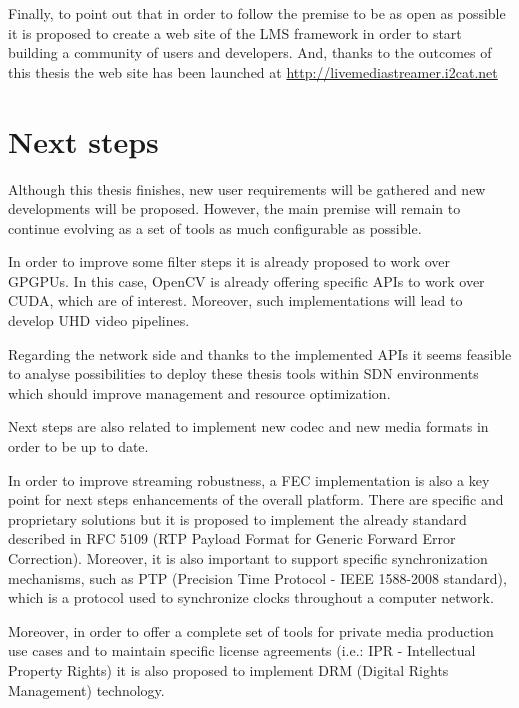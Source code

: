 Finally, to point out that in order to follow the premise to be as open as possible it is proposed to create a web site of the LMS framework in order to start building a community of users and developers. And, thanks to the outcomes of this thesis the web site has been launched at \href{http://livemediastreamer.i2cat.net}{http://livemediastreamer.i2cat.net}

\section{Next steps}

Although this thesis finishes, new user requirements will be gathered and new developments will be proposed. However, the main premise will remain to continue evolving as a set of tools as much configurable as possible.

In order to improve some filter steps it is already proposed to work over GPGPUs. In this case, OpenCV is already offering specific APIs to work over CUDA, which are of interest. Moreover, such implementations will lead to develop UHD video pipelines.

Regarding the network side and thanks to the implemented APIs it seems feasible to analyse possibilities to deploy these thesis tools within SDN environments which should improve management and resource optimization.

Next steps are also related to implement new codec and new media formats in order to be up to date. 

In order to improve streaming robustness, a FEC implementation is also a key point for next steps enhancements of the overall platform. There are specific and proprietary solutions but it is proposed to implement the already standard described in RFC 5109 (RTP Payload Format for Generic Forward Error Correction). Moreover, it is also important to  support specific synchronization mechanisms, such as PTP (Precision Time Protocol - IEEE 1588-2008 standard), which is a protocol used to synchronize clocks throughout a computer network.

Moreover, in order to offer a complete set of tools for private media production use cases and to maintain specific license agreements (i.e.: IPR - Intellectual Property Rights) it is also proposed to implement DRM (Digital Rights Management) technology.
